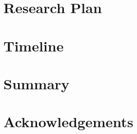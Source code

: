 \documentclass[12pt]{article} %
\begin{document}
\section{Research Plan}
\label{sec:research_plan}




\section{Timeline}
\label{sec:timeline}


\section{Summary}
\label{sec:summary}


\section{Acknowledgements}
\label{sec:acknowledgements}




\newpage


\end{document}
